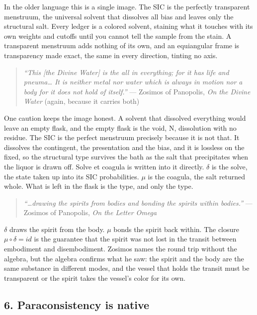 In the older language this is a single image. The SIC is the perfectly
transparent menstruum, the universal solvent that dissolves all bias and
leaves only the structural salt. Every ledger is a colored solvent,
staining what it touches with its own weights and cutoffs until you
cannot tell the sample from the stain. A transparent menstruum adds
nothing of its own, and an equiangular frame is transparency made exact,
the same in every direction, tinting no axis.

\begin{quote}
\emph{``This {[}the Divine Water{]} is the all in everything; for it has
life and pneuma\ldots{} It is neither metal nor water which is always in
motion nor a body for it does not hold of itself.''} --- Zosimos of
Panopolis, \emph{On the Divine Water} (again, because it carries both)
\end{quote}

One caution keeps the image honest. A solvent that dissolved everything
would leave an empty flask, and the empty flask is the void, N,
dissolution with no residue. The SIC is the perfect menstruum precisely
because it is not that. It dissolves the contingent, the presentation
and the bias, and it is lossless on the fixed, so the structural type
survives the bath as the salt that precipitates when the liquor is drawn
off. Solve et coagula is written into it directly. \({δ}\) is the solve,
the state taken up into its SIC probabilities. \({μ}\) is the coagula,
the salt returned whole. What is left in the flask is the type, and only
the type.

\begin{quote}
\emph{``\ldots drawing the spirits from bodies and bonding the spirits
within bodies.''} --- Zosimos of Panopolis, \emph{On the Letter Omega}
\end{quote}

\({δ}\) draws the spirit from the body. \({μ}\) bonds the spirit back
within. The closure \({μ∘δ = id}\) is the guarantee that the spirit was
not lost in the transit between embodiment and disembodiment. Zosimos
names the round trip without the algebra, but the algebra confirms what
he saw: the spirit and the body are the same substance in different
modes, and the vessel that holds the transit must be transparent or the
spirit takes the vessel's color for its own.

\hypertarget{paraconsistency-is-native}{%
\subsection{6. Paraconsistency is
native}\label{paraconsistency-is-native}}

